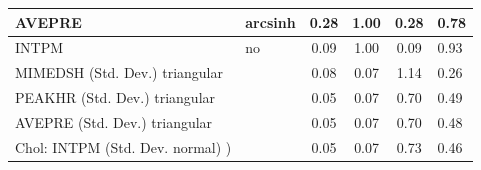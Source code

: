 \begin{table}
\begin{center}
\begin{tabular}{|l|l|c|c|c|l|}
			\hline
			AVEPRE & arcsinh & 0.28 & 1.00 & 0.28 & 0.78 \\
			\hline
			INTPM & no & 0.09 & 1.00 & 0.09 & 0.93 \\
			\hline
			MIMEDSH (Std. Dev.) triangular &  & 0.08 & 0.07 & 1.14 & 0.26 \\
			\hline
			PEAKHR (Std. Dev.) triangular &  & 0.05 & 0.07 & 0.70 & 0.49 \\
			\hline
			AVEPRE (Std. Dev.) triangular &  & 0.05 & 0.07 & 0.70 & 0.48 \\
			\hline
			 Chol: INTPM (Std. Dev. normal) ) &  & 0.05 & 0.07 & 0.73 & 0.46 \\
			\hline
		\end{tabular}
	\end{center}
\end{table}